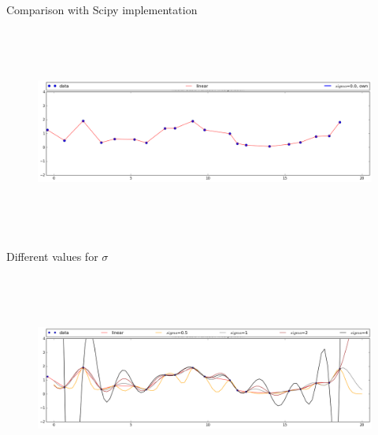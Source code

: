 \documentclass[xcolor={x11names,svgnames,dvipsnames},trans]{beamer}
\begin{document}
\begin{frame}{Comparison with Scipy implementation}
    \begin{center}
        \begin{figure}
            \includegraphics[height=6.888cm, width=12.111cm]{images/rbf_interpolation_own.png}
        \end{figure}
    \end{center}
\end{frame}

\begin{frame}{Different values for $\sigma$}
    \begin{center}
        \begin{figure}
            \includegraphics[height=6.888cm, width=12.111cm]{images/rbf_interpolation_sci.png}
        \end{figure}
    \end{center}
\end{frame}
\end{document}
